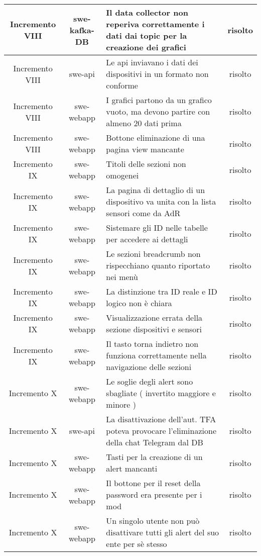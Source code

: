 \begin{center}
\begin{longtable}{|c|c|p{9.5cm}|c|}
    \hline
    Incremento VIII & swe-kafka-DB & Il data collector non reperiva correttamente i dati dai topic per la creazione dei grafici & risolto \\
    \hline
    Incremento VIII & swe-api & Le api inviavano i dati dei dispositivi in un formato non conforme & risolto \\
    \hline
    Incremento VIII & swe-webapp & I grafici partono da un grafico vuoto, ma devono partire con almeno 20 dati prima & risolto \\
    \hline
    Incremento VIII & swe-webapp & Bottone eliminazione di una pagina view mancante & risolto \\
    \hline
    Incremento IX & swe-webapp & Titoli delle sezioni non omogenei & risolto \\
    \hline
    Incremento IX & swe-webapp & La pagina di dettaglio di un dispositivo va unita con la lista sensori come da AdR & risolto \\
    \hline
    Incremento IX & swe-webapp & Sistemare gli ID nelle tabelle per accedere ai dettagli & risolto \\
    \hline
    Incremento IX & swe-webapp & Le sezioni breadcrumb non rispecchiano quanto riportato nei menù & risolto \\
    \hline
    Incremento IX & swe-webapp & La distinzione tra ID reale e ID logico non è chiara & risolto \\
    \hline
    Incremento IX & swe-webapp & Visualizzazione errata della sezione dispositivi e sensori & risolto \\
    \hline
    Incremento IX & swe-webapp & Il tasto torna indietro non funziona correttamente nella navigazione delle sezioni & risolto \\
    \hline
    Incremento X & swe-webapp & Le soglie degli alert sono sbagliate ( invertito maggiore e minore  ) & risolto \\
    \hline
    Incremento X & swe-api & La disattivazione dell'aut. TFA poteva provocare l'eliminazione della chat Telegram dal DB & risolto \\
    \hline
    Incremento X & swe-webapp & Tasti per la creazione di un alert mancanti & risolto \\
    \hline
    Incremento X & swe-webapp & Il bottone per il reset della password era presente per i mod & risolto \\
    \hline
    Incremento X & swe-webapp & Un singolo utente non può disattivare tutti gli alert del suo ente per sè stesso & risolto \\

\end{longtable}
\end{center}
